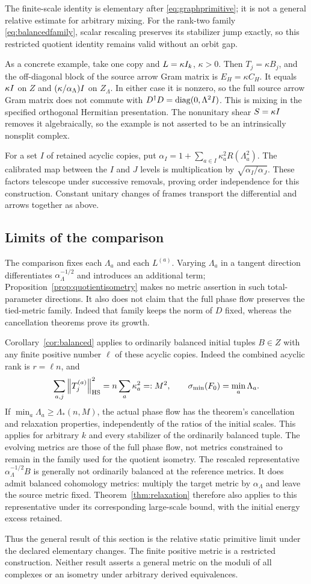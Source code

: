 The finite-scale identity is elementary after \eqref{eq:graphprimitive};
it is not a general relative estimate for arbitrary mixing.
For the rank-two family \eqref{eq:balancedfamily}, scalar rescaling
preserves its stabilizer jump exactly, so this restricted quotient
identity remains valid without an orbit gap.

As a concrete example, take one copy and $L=\kappa I_k$, $\kappa>0$.
Then $T_j=\kappa B_j$, and the off-diagonal block of the source
arrow Gram matrix is $E_H=\kappa C_H$.
It equals $\kappa I$ on $Z$ and
$(\kappa/\alpha_\Lambda)I$ on $Z_\Lambda$.
In either case it is nonzero, so the full source arrow Gram matrix
does not commute with $D^\dagger D=\operatorname{diag}(0,\Lambda^2I)$.
This is mixing in the specified orthogonal Hermitian presentation.
The nonunitary shear $S=\kappa I$ removes it algebraically, so
the example is not asserted to be an intrinsically nonsplit complex.

For a set $I$ of retained acyclic copies, put
$\alpha_I=1+\sum_{a\in I}\kappa_a^2R(\Lambda_a^2)$.
The calibrated map between the $I$ and $J$ levels is multiplication
by $\sqrt{\alpha_I/\alpha_J}$. These factors telescope under
successive removals, proving order independence for this construction.
Constant unitary changes of frames transport the differential and
arrows together as above.

\subsection{Limits of the comparison}
The comparison fixes each $\Lambda_a$ and each $L^{(a)}$.
Varying $\Lambda_a$ in a tangent direction differentiates
$\alpha_\Lambda^{-1/2}$ and introduces an additional term;
Proposition~\ref{prop:quotientisometry} makes no metric assertion in
such total-parameter directions.
It also does not claim that the full phase flow preserves the
tied-metric family. Indeed that family keeps the norm of $D$ fixed,
whereas the cancellation theorems prove its growth.

Corollary~\ref{cor:balanced} applies to ordinarily balanced initial
tuples $B\in Z$ with any finite positive number $\ell$ of these acyclic
copies. Indeed the combined acyclic rank is $r=\ell n$, and
\[
 \sum_{a,j}\left\lVert T_j^{(a)}\right\rVert_{\mathrm{HS}}^2
   =n\sum_a\kappa_a^2=:M^2,\qquad
 \sigma_{\min}(F_0)=\min_a\Lambda_a.
\]
If $\min_a\Lambda_a\geq\Lambda_*(n,M)$, the actual phase flow has
the theorem's cancellation and relaxation properties, independently
of the ratios of the initial scales. This applies for arbitrary $k$
and every stabilizer of the ordinarily balanced tuple.
The evolving metrics are those of the full phase flow, not metrics
constrained to remain in the family used for the quotient isometry.
The rescaled representative $\alpha_\Lambda^{-1/2}B$ is generally
not ordinarily balanced at the reference metrics. It does admit balanced
cohomology metrics: multiply the target metric by $\alpha_\Lambda$
and leave the source metric fixed. Theorem~\ref{thm:relaxation} therefore
also applies to this representative under its corresponding large-scale
bound, with the initial energy excess retained.

Thus the general result of this section is the relative static
primitive limit under the declared elementary changes.
The finite positive metric is a restricted construction.
Neither result asserts a general metric on the moduli of all
complexes or an isometry under arbitrary derived equivalences.
